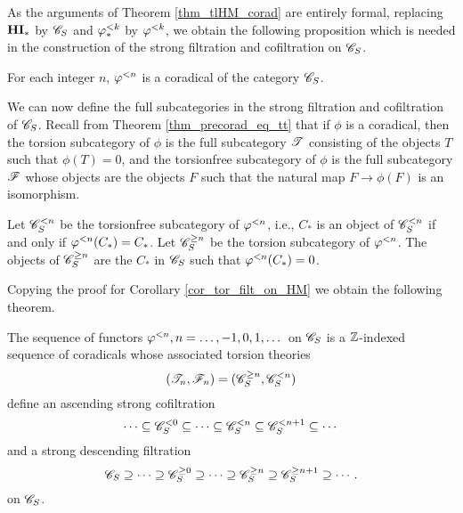 As the arguments of Theorem \ref{thm_tlHM_corad} are 
entirely formal, replacing $\HM$ by $\CatLoc{C}{S}$ and $\tlHM{k}$ by
$\corad{k}$, we obtain the following proposition
which is needed in the construction of the strong filtration and
cofiltration on $\CatLoc{C}{S}$. 

\begin{prop}\label{prop_corad_loc_general}
For each integer $n$, $\corad{n}$ is a coradical of the category
$\CatLoc{C}{S}$.
\end{prop}

We can now define the full subcategories in the strong filtration
and cofiltration of $\CatLoc{C}{S}$. Recall from Theorem
\ref{thm_precorad_eq_tt} that if $\phi$ is a coradical, then the
torsion subcategory of $\phi$ is the full subcategory $\Cat{T}$
consisting of the objects $T$ such that $\phi(T) = 0$, and the
torsionfree subcategory of $\phi$ is the full subcategory $\Cat{F}$
whose objects are the objects $F$ such that the natural map $F 
\to \phi(F)$ is an isomorphism.

\begin{defn}\label{def_torsion_filt_general}
Let $\Corad{n}{\CatLoc{C}{S}}$ be the torsionfree subcategory of
$\corad{n}$, i.e., $C_*$ is an object of $\Corad{n}{\CatLoc{C}{S}}$
if and only if $\corad{n}(C_*) = C_*$. Let 
$\Prerad{n}{\CatLoc{C}{S}}$ be the torsion subcategory of $\corad{n}$.
The objects of $\Prerad{n}{\CatLoc{C}{S}}$ are the $C_*$ in 
$\CatLoc{C}{S}$ such that $\corad{n}(C_*) = 0$.
\end{defn}

Copying the proof for Corollary \ref{cor_tor_filt_on_HM} we obtain 
the following theorem.

\begin{thm}
\label{thm_sum_heart_loc}
The sequence of functors $\corad{n}, n = \dots, -1, 0, 1, \dots$ on
$\CatLoc{C}{S}$ is a $\Z$-indexed sequence of coradicals whose 
associated torsion theories 
\[
(\Cat{T}_n, \Cat{F}_n) = (\Prerad{n}{\CatLoc{C}{S}}, \Corad{n}{\CatLoc{C}{S}})
\]
define an ascending strong cofiltration
\[
\cdots \subseteq \Corad{0}{\CatLoc{C}{S}} \subseteq \cdots \subseteq 
   \Corad{n}{\CatLoc{C}{S}} \subseteq \Corad{n + 1}{\CatLoc{C}{S}}
   \subseteq \cdots
\]
and a strong descending filtration
\[
\CatLoc{C}{S} \supseteq \cdots \supseteq \Prerad{0}{\CatLoc{C}{S}}
   \supseteq \cdots \supseteq \Prerad{n}{\CatLoc{C}{S}} \supseteq 
   \Prerad{n + 1}{\CatLoc{C}{S}} \supseteq \cdots.
\]
on $\CatLoc{C}{S}$.
\end{thm}

